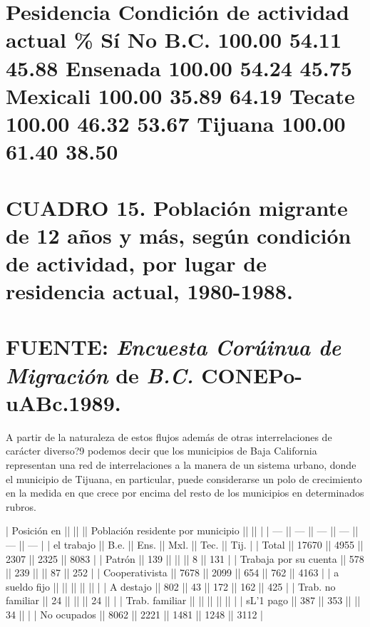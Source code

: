 \documentclass{article}
\begin{document}
\section{Pesidencia Condición de actividad actual \% Sí No B.C. 100.00 54.11 45.88 Ensenada 100.00 54.24 45.75 Mexicali 100.00 35.89 64.19 Tecate 100.00 46.32 53.67 Tijuana 100.00 61.40 38.50}

\section{CUADRO 15. Población migrante de 12 años y más, según condición de actividad, por lugar de residencia actual, 1980-1988.}

\section{FUENTE: \textit{Encuesta Corúinua de Migración} de \textit{B.C.} CONEPo-uABc.1989.}

A partir de la naturaleza de estos flujos además de otras interrelaciones de carácter diverso?9 podemos decir que los municipios de Baja California representan una red de interrelaciones a la manera de un sistema urbano, donde el municipio de Tijuana, en particular, puede considerarse un polo de crecimiento en la medida en que crece por encima del resto de los municipios en determinados rubros.

| Posición en           ||       ||      || Población residente por municipio ||      ||      |
| ---                   || ---   || ---  || ---                               || ---  || ---  |
| el trabajo            || B.e.  || Ens. || Mxl.                              || Tec. || Tij. |
| Total                 || 17670 || 4955 || 2307                              || 2325 || 8083 |
| Patrón                || 139   ||      ||                                   || 8    || 131  |
| Trabaja por su cuenta || 578   || 239  ||                                   || 87   || 252  |
| Cooperativista        || 7678  || 2099 || 654                               || 762  || 4163 |
| a sueldo fijo         ||       ||      ||                                   ||      ||      |
| A destajo             || 802   || 43   || 172                               || 162  || 425  |
| Trab. no familiar     || 24    ||      ||                                   || 24   ||      |
| Trab. familiar        ||       ||      ||                                   ||      ||      |
| sL'1 pago             || 387   || 353  ||                                   || 34   ||      |
| No ocupados           || 8062  || 2221 || 1481                              || 1248 || 3112 |
\end{document}
